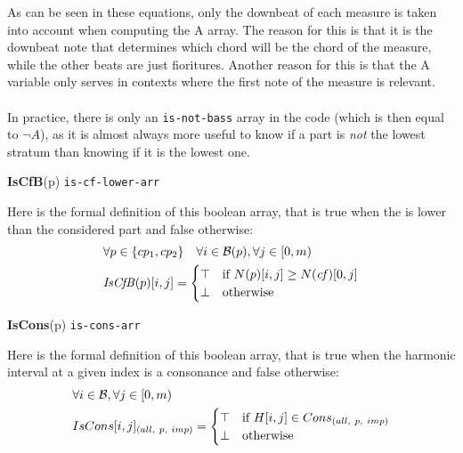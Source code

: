 As can be seen in these equations, only the downbeat of each measure is taken into account when computing the A array. The reason for this is that it is the downbeat note that determines which chord will be the chord of the measure, while the other beats are just fioritures. Another reason for this is that the A variable only serves in contexts where the first note of the measure is relevant.

\paragraph{}
In practice, there is only an \texttt{is-not-bass} array in the code (which is then equal to $\neg A$), as it is almost always more useful to know if a part is \textit{not} the lowest stratum than knowing if it is the lowest one. 

\vspace{.5cm} \noindent \textbf{IsCfB}(p) \hspace{.cm} \texttt{is-cf-lower-arr} \label{is-cf-b}

Here is the formal definition of this boolean array, that is true when the \cfs is lower than the considered part and false otherwise:
\begin{equation}
    \begin{aligned}
    &\forall p \in \{cp_1, cp_2\} \quad \forall i \in \mathcal{B}(p), \forall j \in [0, m)\\
    & \mathit{IsCfB}(p)[i, j] =
    \begin{cases}
        \top & \text{if } N(p)[i, j] \geq N(\mathit{cf})[0,j] \\
        \bot & \text{otherwise}
    \end{cases}
    \end{aligned}
\end{equation}

\vspace{.5cm} \noindent \textbf{IsCons}(p) \hspace{.cm} \texttt{is-cons-arr} \label{is-cons}

Here is the formal definition of this boolean array, that is true when the harmonic interval at a given index is a consonance and false otherwise:
\begin{equation}
    \begin{aligned}
    &\forall i \in \mathcal{B}, \forall j \in [0, m)\\
    &IsCons[i, j]_{(all,\ p,\ imp)} =
    \begin{cases}
        \top & \text{if } H[i, j] \in Cons_{(all,\ p,\ imp)}\\
        \bot & \text{otherwise}
    \end{cases}
    \end{aligned}
\end{equation}